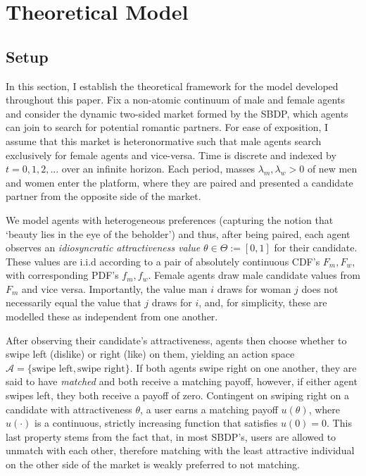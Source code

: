 \section{Theoretical Model}
\label{sec:section2}
\subsection{Setup}\label{sec:section2.1} 
In this section, I establish the theoretical framework for the model developed throughout this paper. Fix a non-atomic continuum of male and female agents and consider the dynamic two-sided market formed by the SBDP, which agents can join to search for potential romantic partners. 
For ease of exposition, I assume that this market is heteronormative such that male agents search exclusively for female agents and vice-versa. 
Time is discrete and indexed by $t=0, 1, 2, ...$ over an infinite horizon. Each period, masses $\lambda_m, \lambda_w>0$ of new men and women enter the platform, where they are paired and presented a candidate partner from the opposite side of the market. 

We model agents with heterogeneous preferences (capturing the notion that `beauty lies in the eye of the beholder') and thus, after being paired, each agent observes an \textit{idiosyncratic attractiveness value} $\theta \in \Theta := [0,1]$ for their candidate. 
These values are i.i.d according to a pair of absolutely continuous CDF's $F_m, F_w$, with corresponding PDF's $f_m,f_w$. 
Female agents draw male candidate values from $F_m$ and vice versa. 
Importantly, the value man $i$ draws for woman $j$ does not necessarily equal the value that $j$ draws for $i$, and, for simplicity, these are modelled these as independent from one another.

After observing their candidate's attractiveness, agents then choose whether to swipe left (dislike) or right (like) on them, yielding an action space $\mathcal{A}=\{ \text{swipe left}, \text{swipe right}\}$. 
If both agents swipe right on one another, they are said to have \textit{matched} and both receive a matching payoff, however, if either agent swipes left, they both receive a payoff of zero. Contingent on swiping right on a candidate with attractiveness $\theta$, a user earns a matching payoff $u(\theta)$, where $u(\cdot)$ is a continuous, strictly increasing function that satisfies $u(0) = 0$. 
This last property stems from the fact that, in most SBDP's, users are allowed to unmatch with each other, therefore matching with the least attractive individual on the other side of the market is weakly preferred to not matching. 

